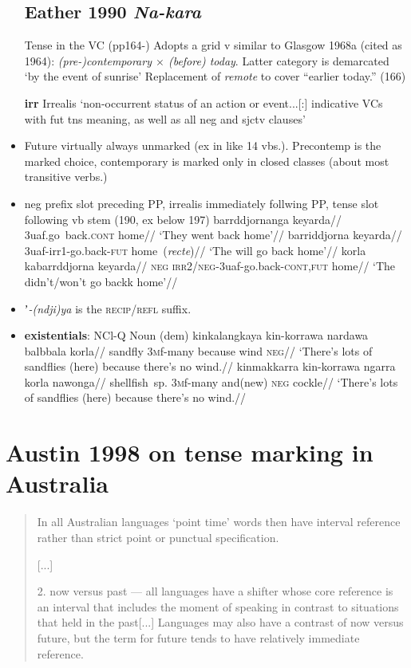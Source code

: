 \documentclass[10pt]{article}
\begin{document}
\begin{itemize}
	\subsection{Eather 1990 \textit{Na-kara}}
	\item[Tense in the VC (pp164-)] Adopts a grid v similar to Glasgow 1968a (cited as 1964): \textit{(pre-)contemporary $\times$ (before) today}. Latter category is demarcated `by the event of sunrise' Replacement of \textit{remote} to cover ``earlier today.'' (166)
	\item[\textbf{irr}] Irrealis `non-occurrent status of an action or event...[:] indicative VCs with fut tns meaning, as well as all neg and sjctv clauses'
	\item Future virtually always unmarked (ex in like 14 vbs.). Precontemp is the marked choice, contemporary is marked only in closed classes (about most transitive verbs.)
	\item neg prefix slot preceding PP, irrealis immediately follwing PP, tense slot following vb stem (190, ex below 197)
	\pex\a\begingl\gla barrddjornanga keyarda//
	\glb 3uaf.go~back.\textsc{cont} home//
	\glft`They went back home'//\endgl
	\a\begingl\gla barriddjorna keyarda//
	\glb 3uaf-irr1-go.back-\textsc{fut} home~(\textit{recte})//
	\glft`The will go back home'//\endgl
	\a\begingl\gla korla kabarrddjorna keyarda//
	\glb \textsc{neg} \textsc{irr2/neg}-3uaf-go.back-\textsc{cont,fut} home//
	\glft`The didn't/won't go backk home'//\endgl\xe
	\item ʼ\textit{-(ndji)ya} is the \textsc{recip/refl} suffix.
	
	\item \textbf{existentials}: NCl-Q Noun (dem)
	\pex\a\begingl\gla kinkalangkaya kin-korrawa nardawa balbbala korla//
	\glb sandfly 3\textsc{m}f-many because wind \textsc{neg}//
	\glft`There's lots of sandflies (here) because there's no wind.//\endgl
	\a\begingl\gla kinmakkarra kin-korrawa ngarra korla nawonga//
	\glb shellfish~sp. 3\textsc{m}f-many and(new)  \textsc{neg} cockle//
	\glft`There's lots of sandflies (here) because there's no wind.//\endgl
	\xe

		\end{itemize}
	
	
	\section{Austin 1998 on tense marking in Australia}
	
	\begin{quote}
		
		
		
		In all Australian languages ‘point time’ words then have interval reference rather than strict point or punctual specification.
		
		[...]
		
		2. now versus past — all languages have a shifter whose core reference is an interval that includes the moment of speaking in contrast to situations that held in the past[...] Languages may also have a contrast of now versus future, but the term for future tends to have relatively immediate reference.
		
		\citep[147]{Austin1998}
	\end{quote}
\end{document}
